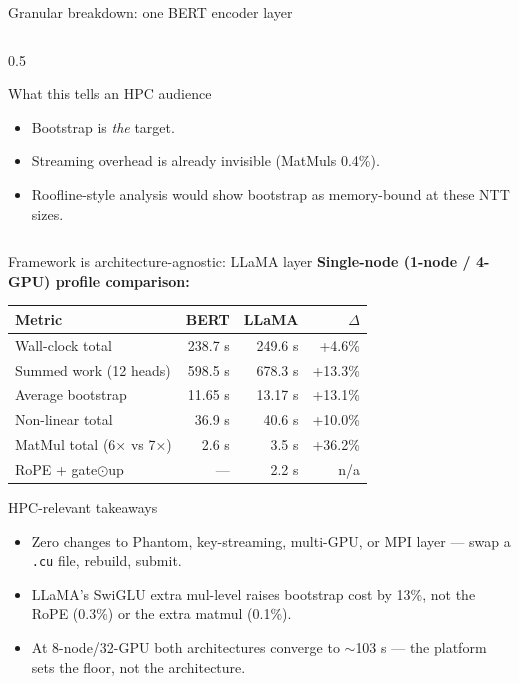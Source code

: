 \documentclass[aspectratio=169]{beamer}
\begin{document}
\begin{frame}{Granular breakdown: one BERT encoder layer}
\begin{columns}[T]
\begin{column}{0.5\textwidth}
      \vspace{1em}
      \begin{block}{What this tells an HPC audience}
        \footnotesize
        \begin{itemize}
          \item Bootstrap is \emph{the} target.
          \item Streaming overhead is already invisible (MatMuls 0.4\%).
          \item Roofline-style analysis would show bootstrap as memory-bound
                at these NTT sizes.
        \end{itemize}
      \end{block}
    \end{column}
  \end{columns}
\end{frame}

\begin{frame}{Framework is architecture-agnostic: LLaMA layer}
  \scriptsize
  \textbf{Single-node (1-node / 4-GPU) profile comparison:}
  \vspace{0.2em}
  \begin{tabular}{@{}lrrr@{}}
    \toprule
    Metric & BERT & LLaMA & $\Delta$ \\
    \midrule
    Wall-clock total         & 238.7 s & 249.6 s & +4.6\% \\
    Summed work (12 heads)   & 598.5 s & 678.3 s & +13.3\% \\
    Average bootstrap        & 11.65 s & 13.17 s & +13.1\% \\
    Non-linear total         & \phantom{1}36.9 s & \phantom{1}40.6 s & +10.0\% \\
    MatMul total (6× vs 7×)  & \phantom{10}2.6 s & \phantom{10}3.5 s & +36.2\% \\
    RoPE + gate$\odot$up     & — & \phantom{10}2.2 s & n/a \\
    \bottomrule
  \end{tabular}
  \vspace{0.6em}
  \normalsize
  \begin{block}{HPC-relevant takeaways}
    \footnotesize
    \begin{itemize}
      \item Zero changes to Phantom, key-streaming, multi-GPU, or MPI layer —
            swap a \texttt{.cu} file, rebuild, submit.
      \item LLaMA's SwiGLU extra mul-level raises bootstrap cost by 13\%,
            not the RoPE (0.3\%) or the extra matmul (0.1\%).
      \item At 8-node/32-GPU both architectures converge to $\sim$103 s —
            the platform sets the floor, not the architecture.
    \end{itemize}
  \end{block}
\end{frame}
\end{document}
